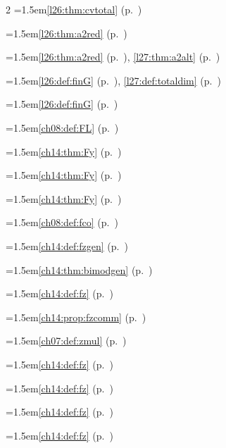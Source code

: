 \begin{multicols}{2}
\hangindent=1.5em\quad \ref{l26:thm:cvtotal} (p.~\pageref{l26:thm:cvtotal})\par
\hangindent=1.5em\quad \ref{l26:thm:a2red} (p.~\pageref{l26:thm:a2red})\par
\hangindent=1.5em\quad \ref{l26:thm:a2red} (p.~\pageref{l26:thm:a2red}), \ref{l27:thm:a2alt} (p.~\pageref{l27:thm:a2alt})\par
\hangindent=1.5em\quad \ref{l26:def:finG} (p.~\pageref{l26:def:finG}), \ref{l27:def:totaldim} (p.~\pageref{l27:def:totaldim})\par
\hangindent=1.5em\quad \ref{l26:def:finG} (p.~\pageref{l26:def:finG})\par
\hangindent=1.5em\quad \ref{ch08:def:FL} (p.~\pageref{ch08:def:FL})\par
\hangindent=1.5em\quad \ref{ch14:thm:Fy} (p.~\pageref{ch14:thm:Fy})\par
\hangindent=1.5em\quad \ref{ch14:thm:Fy} (p.~\pageref{ch14:thm:Fy})\par
\hangindent=1.5em\quad \ref{ch14:thm:Fy} (p.~\pageref{ch14:thm:Fy})\par
\hangindent=1.5em\quad \ref{ch08:def:fco} (p.~\pageref{ch08:def:fco})\par
\hangindent=1.5em\quad \ref{ch14:def:fzgen} (p.~\pageref{ch14:def:fzgen})\par
\hangindent=1.5em\quad \ref{ch14:thm:bimodgen} (p.~\pageref{ch14:thm:bimodgen})\par
\hangindent=1.5em\quad \ref{ch14:def:fz} (p.~\pageref{ch14:def:fz})\par
\hangindent=1.5em\quad \ref{ch14:prop:fzcomm} (p.~\pageref{ch14:prop:fzcomm})\par
\hangindent=1.5em\quad \ref{ch07:def:zmul} (p.~\pageref{ch07:def:zmul})\par
\hangindent=1.5em\quad \ref{ch14:def:fz} (p.~\pageref{ch14:def:fz})\par
\hangindent=1.5em\quad \ref{ch14:def:fz} (p.~\pageref{ch14:def:fz})\par
\hangindent=1.5em\quad \ref{ch14:def:fz} (p.~\pageref{ch14:def:fz})\par
\hangindent=1.5em\quad \ref{ch14:def:fz} (p.~\pageref{ch14:def:fz})\par

\end{multicols}
